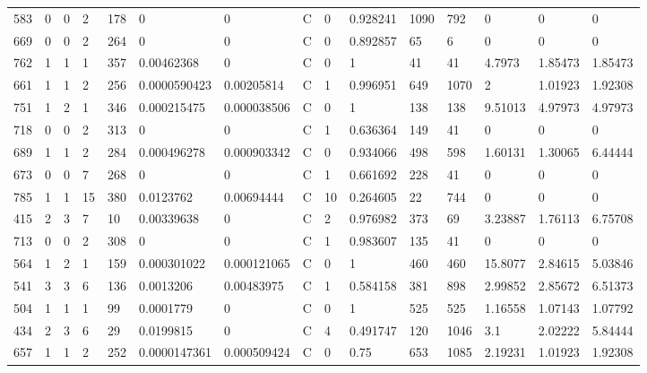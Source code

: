 \begin{latin}
\begin{longtable}{lllllllllllllll}
	583 & 0  & 0   & 2  & 178 & 0              & 0              & C & 0  & 0.928241 & 1090 & 792  & 0       & 0       & 0       \\
	669 & 0  & 0   & 2  & 264 & 0              & 0              & C & 0  & 0.892857 & 65   & 6    & 0       & 0       & 0       \\
	762 & 1  & 1   & 1  & 357 & 0.00462368     & 0              & C & 0  & 1        & 41   & 41   & 4.7973  & 1.85473 & 1.85473 \\
	661 & 1  & 1   & 2  & 256 & 0.0000590423   & 0.00205814     & C & 1  & 0.996951 & 649  & 1070 & 2       & 1.01923 & 1.92308 \\
	751 & 1  & 2   & 1  & 346 & 0.000215475    & 0.000038506    & C & 0  & 1        & 138  & 138  & 9.51013 & 4.97973 & 4.97973 \\
	718 & 0  & 0   & 2  & 313 & 0              & 0              & C & 1  & 0.636364 & 149  & 41   & 0       & 0       & 0       \\
	689 & 1  & 1   & 2  & 284 & 0.000496278    & 0.000903342    & C & 0  & 0.934066 & 498  & 598  & 1.60131 & 1.30065 & 6.44444 \\
	673 & 0  & 0   & 7  & 268 & 0              & 0              & C & 1  & 0.661692 & 228  & 41   & 0       & 0       & 0       \\
	785 & 1  & 1   & 15 & 380 & 0.0123762      & 0.00694444     & C & 10 & 0.264605 & 22   & 744  & 0       & 0       & 0       \\
	415 & 2  & 3   & 7  & 10  & 0.00339638     & 0              & C & 2  & 0.976982 & 373  & 69   & 3.23887 & 1.76113 & 6.75708 \\
	713 & 0  & 0   & 2  & 308 & 0              & 0              & C & 1  & 0.983607 & 135  & 41   & 0       & 0       & 0       \\
	564 & 1  & 2   & 1  & 159 & 0.000301022    & 0.000121065    & C & 0  & 1        & 460  & 460  & 15.8077 & 2.84615 & 5.03846 \\
	541 & 3  & 3   & 6  & 136 & 0.0013206      & 0.00483975     & C & 1  & 0.584158 & 381  & 898  & 2.99852 & 2.85672 & 6.51373 \\
	504 & 1  & 1   & 1  & 99  & 0.0001779      & 0              & C & 0  & 1        & 525  & 525  & 1.16558 & 1.07143 & 1.07792 \\
	434 & 2  & 3   & 6  & 29  & 0.0199815      & 0              & C & 4  & 0.491747 & 120  & 1046 & 3.1     & 2.02222 & 5.84444 \\
	657 & 1  & 1   & 2  & 252 & 0.0000147361   & 0.000509424    & C & 0  & 0.75     & 653  & 1085 & 2.19231 & 1.01923 & 1.92308 \\

\end{longtable}
\end{latin}
